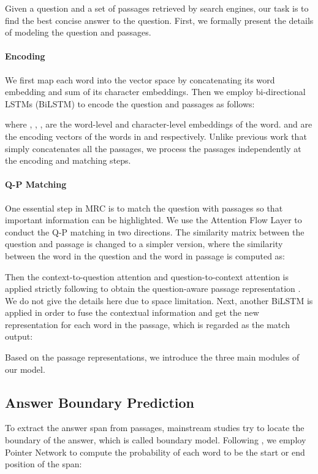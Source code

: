 \documentclass[11pt,a4paper]{article}
\begin{document}
Given a question  and a set of passages 
  retrieved by search engines, 
our task is to find the best concise answer to the question. First, we formally present the details of modeling the question and passages.


\paragraph{Encoding} We first map each word into the vector space by concatenating its word embedding and sum of its character embeddings. Then we employ bi-directional LSTMs (BiLSTM) to encode the question  and passages  as follows:

\noindent where , , ,  are the word-level and character-level embeddings of the  word.  and  are the encoding vectors of the  words in  and  respectively.
Unlike previous work \cite{rnet} that simply concatenates all the passages, we process the passages independently at the encoding and matching steps. 

\paragraph{Q-P Matching} One essential step in MRC is to match the question with passages so that important information can be highlighted. We use the Attention Flow Layer \cite{bidaf} to conduct the Q-P matching in two directions. The similarity matrix  between the question and passage  is changed to a simpler version, where the similarity between the  word in the question and the  word in passage  is computed as:



Then the context-to-question attention and question-to-context attention is applied strictly following  to obtain the question-aware passage representation .
We do not give the details here due to space limitation. Next, another BiLSTM is applied in order to fuse the contextual information and get the new representation for each word in the passage, which is regarded as the match output:



Based on the passage representations, we introduce the three main modules of our model.

\subsection{Answer Boundary Prediction}
\label{boundary}


To extract the answer span from passages, mainstream studies try to locate the boundary of the answer, which is called boundary model. Following \cite{match-lstm}, we employ Pointer Network \cite{pointer-net} to compute the probability of each word to be the start or end position of the span:
\end{document}
